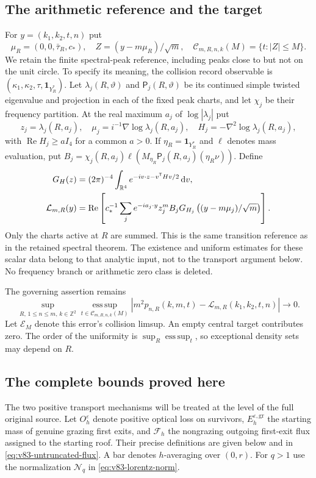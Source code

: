 \documentclass[11pt,reqno]{amsart}
\numberwithin{equation}{section}
\theoremstyle{definition}
\theoremstyle{remark}\newtheorem{remark}[theorem]{Remark}
\newcommand{\R}{\mathbb R}\newcommand{\Z}{\mathbb Z}
\newcommand{\one}{\mathbf1}\newcommand{\dd}{\,\mathrm d}
\newcommand{\esssup}{\operatorname*{ess\,sup}}
\begin{document}
\subsection{The arithmetic reference and the target}
For $y=(k_1,k_2,t,n)$ put
\[
 \mu_R=(0,0,\bar\tau_R,c_*),\quad
 Z=(y-m\mu_R)/\sqrt m,\quad
 \mathcal C_{m,R,n,k}(M)=\{t:|Z|\le M\}.
\]
We retain the finite spectral-peak reference, including peaks close to
but not on the unit circle. To specify its meaning, the collision
record observable is $(\kappa_1,\kappa_2,\tau,\one_{Y_R^*})$.
Let $\lambda_j(R,\vartheta)$ and $\mathsf P_j(R,\vartheta)$ be its
continued simple twisted eigenvalue and projection in each of the
fixed peak charts, and let $\chi_j$ be their frequency partition.
At the real maximum $a_j$ of $\log|\lambda_j|$ put
\[
 z_j=\lambda_j(R,a_j),\quad
 \mu_j=i^{-1}\nabla\log\lambda_j(R,a_j),\quad
 H_j=-\nabla^2\log\lambda_j(R,a_j),
\]
with $\operatorname{Re}H_j\ge aI_4$ for a common $a>0$. If
$\eta_R=\one_{Y_R^*}$ and $\ell$ denotes mass evaluation, put
$B_j=\chi_j(R,a_j)\ell(M_{\eta_R}\mathsf P_j(R,a_j)(\eta_R\nu))$.
Define
\begin{align}
 G_H(z)&=(2\pi)^{-4}\int_{\R^4}e^{-iv\cdot z-v^{\mathsf T}Hv/2}\dd v,
 \notag\\
 \mathcal L_{m,R}(y)&=\operatorname{Re}\left[
 c_*^{-1}\sum_j e^{-ia_j\cdot y}z_j^m B_j
      G_{H_j}\left((y-m\mu_j)/\sqrt m\right)\right].
 \label{eq:v76-reference}
\end{align}
Only the charts active at $R$ are summed. This is the same transition
reference as in the retained spectral theorem. The existence and
uniform estimates for these scalar data belong to that analytic
input, not to the transport argument below. No frequency branch or
arithmetic zero class is deleted.

The governing assertion remains
\begin{equation}\label{eq:v76-target}
 \sup_{R,\,1\le n\le m,\,k\in\Z^2}
 \esssup_{t\in\mathcal C_{m,R,n,k}(M)}
 |m^2p_{n,R}(k,m,t)-\mathcal L_{m,R}(k_1,k_2,t,n)|\longrightarrow0.
\end{equation}
Let $\mathcal E_M$ denote this error's collision limsup. An empty
central target contributes zero. The order of the uniformity is
$\sup_R\esssup_t$, so exceptional density sets may depend on $R$.

\subsection{The complete bounds proved here}
The two positive transport mechanisms will be treated at the level of
the full original source. Let $O_h^\varepsilon$ denote positive optical
loss on survivors, $E_h^{\varepsilon,\mathrm{gr}}$ the starting mass of
genuine grazing first exits, and $\mathcal F_h$ the nongrazing outgoing
first-exit flux assigned to the starting roof. Their precise definitions
are given below and in \eqref{eq:v83-untruncated-flux}. A bar denotes
$h$-averaging over $(0,r)$. For $q>1$ use the normalization
$\mathcal N_q$ in \eqref{eq:v83-lorentz-norm}.
\end{document}
